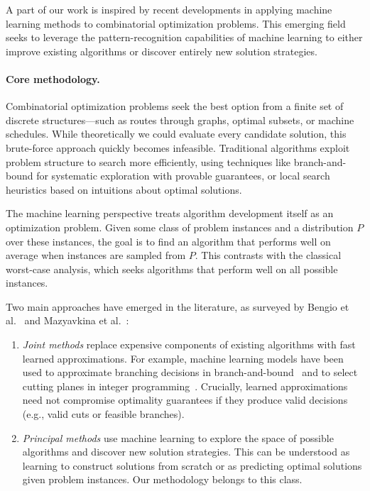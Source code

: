 \documentclass[a4paper]{report}
\theoremstyle{definition}
\theoremstyle{plain}
\begin{document}
A part of our work is inspired by recent developments in applying machine
learning methods to combinatorial optimization problems. This emerging field
seeks to leverage the pattern-recognition capabilities of machine learning to
either improve existing algorithms or discover entirely new solution strategies.

\paragraph{Core methodology.}

Combinatorial optimization problems seek the best option from a finite set of
discrete structures---such as routes through graphs, optimal subsets, or machine
schedules. While theoretically we could evaluate every candidate solution, this
brute-force approach quickly becomes infeasible. Traditional algorithms exploit
problem structure to search more efficiently, using techniques like
branch-and-bound for systematic exploration with provable guarantees, or local
search heuristics based on intuitions about optimal solutions.

The machine learning perspective treats algorithm development itself as an
optimization problem. Given some class of problem instances and a distribution
$P$ over these instances, the goal is to find an algorithm that performs
well on average when instances are sampled from $P$. This contrasts with
the classical worst-case analysis, which seeks algorithms that perform well on
all possible instances.

Two main approaches have emerged in the literature, as surveyed by Bengio et
al.~\cite{bengioMachineLearningCombinatorial2020} and Mazyavkina et
al.~\cite{mazyavkinaReinforcementLearningCombinatorial2020}:

\begin{enumerate}
  \item \emph{Joint methods} replace expensive components of existing algorithms
        with fast learned approximations. For example, machine learning models
        have been used to approximate branching decisions in
        branch-and-bound~\cite{gasseExactCombinatorialOptimization2019} and to
        select cutting planes in integer
        programming~\cite{tangReinforcementLearningInteger2020}. Crucially,
        learned approximations need not compromise optimality guarantees if they
        produce valid decisions (e.g., valid cuts or feasible branches).

  \item \emph{Principal methods} use machine learning to explore the space of
        possible algorithms and discover new solution strategies. This can be
        understood as learning to construct solutions from scratch or as
        predicting optimal solutions given problem instances. Our methodology
        belongs to this class.
\end{enumerate}
\end{document}
